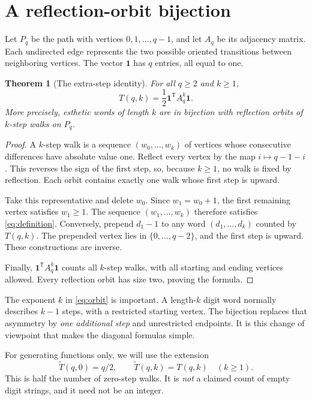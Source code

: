 \documentclass[11pt,letterpaper]{article}
\numberwithin{equation}{section}
\newtheorem{theorem}{Theorem}[section]
\theoremstyle{definition}
\newcommand{\one}{\mathbf 1}
\begin{document}
\section{A reflection-orbit bijection}
\label{sec:orbits}

Let $P_q$ be the path with vertices $0,1,\ldots,q-1$, and let $A_q$ be its
adjacency matrix.  Each undirected edge represents the two possible
oriented transitions between neighboring vertices.  The vector $\one$
has $q$ entries, all equal to one.

\begin{theorem}[The extra-step identity]\label{thm:orbit}
For all $q\ge2$ and $k\ge1$,
\begin{equation}\label{eq:orbit}
T(q,k)=\frac12\one^{\mathsf T}A_q^k\one.
\end{equation}
More precisely, esthetic words of length $k$ are in bijection with
reflection orbits of $k$-step walks on $P_q$.
\end{theorem}

\begin{proof}
A $k$-step walk is a sequence $(w_0,\ldots,w_k)$ of vertices whose
consecutive differences have absolute value one.  Reflect every vertex
by the map $i\mapsto q-1-i$.  This reverses the sign of the first step,
so, because $k\ge1$, no walk is fixed by reflection.  Each orbit contains
exactly one walk whose first step is upward.

Take this representative and delete $w_0$.  Since $w_1=w_0+1$, the first
remaining vertex satisfies $w_1\ge1$.  The sequence
$(w_1,\ldots,w_k)$ therefore satisfies \eqref{eq:definition}.
Conversely, prepend $d_1-1$ to any word $(d_1,\ldots,d_k)$ counted by
$T(q,k)$.  The prepended vertex lies in $\{0,\ldots,q-2\}$, and the first
step is upward.  These constructions are inverse.

Finally, $\one^{\mathsf T}A_q^k\one$ counts all $k$-step walks, with all
starting and ending vertices allowed.  Every reflection orbit has size
two, proving the formula.
\end{proof}

The exponent $k$ in \eqref{eq:orbit} is important.  A length-$k$ digit
word normally describes $k-1$ steps, with a restricted starting vertex.
The bijection replaces that asymmetry by \emph{one additional step} and
unrestricted endpoints.  It is this change of viewpoint that makes the
diagonal formulas simple.

For generating functions only, we will use the extension
\begin{equation}\label{eq:extension}
\widetilde T(q,0)=q/2,\qquad
\widetilde T(q,k)=T(q,k)\quad(k\ge1).
\end{equation}
This is half the number of zero-step walks.  It is \emph{not} a claimed
count of empty digit strings, and it need not be an integer.
\end{document}
